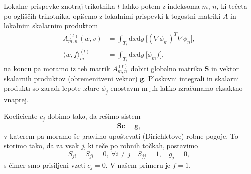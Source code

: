 \documentclass[a4 paper, 12pt]{article}
\renewcommand{\d}{
	\ensuremath{\mathrm{d}}
}
\begin{document}
Lokalne prispevke znotraj trikotnika $t$ lahko potem z indeksoma $m$, $n$, ki te\v ceta po
ogli\v s\v cih trikotnika, opi\v semo z lokalnimi prispevki k togostni matriki $A$ in lokalnim
skalarnim produktom
\begin{align*}
	A^{(t)}_{m,n} (w, v) &= \int_{T_t} \d x\d y\ \big[(\nabla \phi_m)^T \nabla \phi_n\big], \\
		\langle w, f\rangle_m^{(t)} &= \int_{T_t} \d x\d y\ \big[\phi_m f\big],
\end{align*}
na koncu pa moramo iz teh matrik $A_{m,n}^{(t)}$ dobiti globalno matriko $\mathbf{S}$ in vektor
skalarnih produktov (obremenitveni vektor) $\mathbf{g}$. Ploskovni integrali in skalarni produkti
so zaradi lepote izbire $\phi_j$ enostavni in jih lahko izra\v cunamo eksaktno vnaprej.

Koeficiente $c_j$ dobimo tako, da re\v simo sistem
\begin{align*}
	\mathbf{S} \mathbf{c} = \mathbf{g},
\end{align*}
v katerem pa moramo \v se pravilno upo\v stevati (Dirichletove) robne pogoje. To storimo tako, da za
vsak $j$, ki te\v ce po robnih to\v ckah, postavimo
\[
	S_{ji} = S_{ji} = 0,\ \forall i \neq j\quad S_{jj} = 1, \quad g_j = 0,
\]
s \v cimer smo prisiljeni vzeti $c_j = 0$. V na\v sem primeru je $f = 1$.
\end{document}
